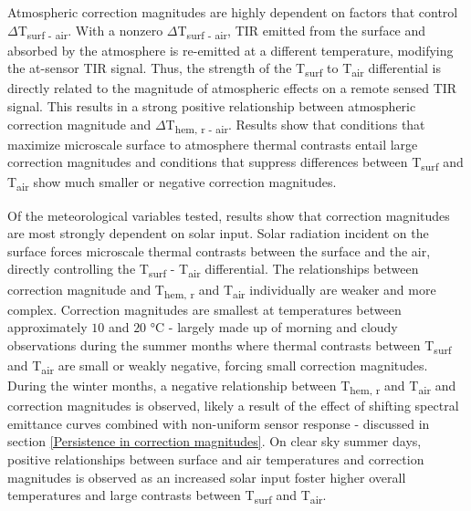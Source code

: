 \begin{bibunit}
Atmospheric correction magnitudes are highly dependent on factors that control $\Delta$T\textsubscript{surf - air}. With a nonzero $\Delta$T\textsubscript{surf - air}, TIR emitted from the surface and absorbed by the atmosphere is re-emitted at a different temperature, modifying the at-sensor TIR signal. Thus, the strength of the T\textsubscript{surf} to T\textsubscript{air} differential is directly related to the magnitude of atmospheric effects on a remote sensed TIR signal. This results in a strong positive relationship between atmospheric correction magnitude and $\Delta$T\textsubscript{hem, r - air}. Results show that conditions that maximize microscale surface to atmosphere thermal contrasts entail large correction magnitudes and conditions that suppress differences between T\textsubscript{surf} and T\textsubscript{air} show much smaller or negative correction magnitudes.

Of the meteorological variables tested, results show that correction magnitudes are most strongly dependent on solar input. Solar radiation incident on the surface forces microscale thermal contrasts between the surface and the air, directly controlling the T\textsubscript{surf} - T\textsubscript{air} differential. The relationships between correction magnitude and T\textsubscript{hem, r} and T\textsubscript{air} individually are weaker and more complex. Correction magnitudes are smallest at temperatures between approximately $10$ and $20$ \si{\degreeCelsius} - largely made up of morning and cloudy observations during the summer months where thermal contrasts between T\textsubscript{surf} and T\textsubscript{air} are small or weakly negative, forcing small correction magnitudes. During the winter months, a negative relationship between T\textsubscript{hem, r} and T\textsubscript{air} and correction magnitudes is observed, likely a result of the effect of shifting spectral emittance curves combined with non-uniform sensor response - discussed in section \ref{Persistence in correction magnitudes}. On clear sky summer days, positive relationships between surface and air temperatures and correction magnitudes is observed as an increased solar input foster higher overall temperatures and large contrasts between T\textsubscript{surf} and T\textsubscript{air}.


\end{bibunit}
